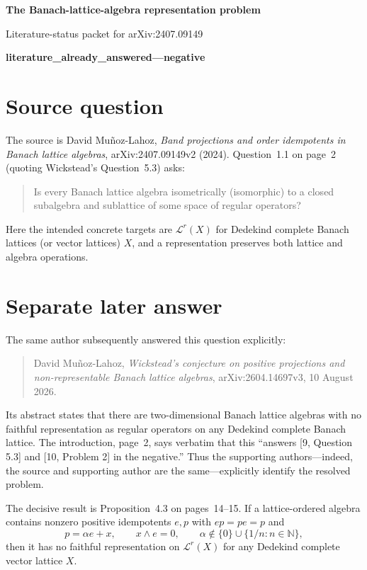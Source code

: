 \documentclass[11pt]{article}
\newcommand{\status}{\textcolor{blue!60!black}{\textbf{literature\_already\_answered---negative}}}
\begin{document}
\begin{center}
{\Large\bfseries The Banach-lattice-algebra representation problem}\par
\vspace{0.3em}
{\large Literature-status packet for arXiv:2407.09149}\par
\vspace{0.4em}
\status
\end{center}

\section*{Source question}

The source is David Mu\~noz-Lahoz, \emph{Band projections and order
idempotents in Banach lattice algebras}, arXiv:2407.09149v2 (2024).
Question~1.1 on page~2 (quoting Wickstead's Question~5.3) asks:
\begin{quote}
Is every Banach lattice algebra isometrically (isomorphic) to a closed
subalgebra and sublattice of some space of regular operators?
\end{quote}
Here the intended concrete targets are $\mathcal L^r(X)$ for Dedekind
complete Banach lattices (or vector lattices) $X$, and a representation
preserves both lattice and algebra operations.

\section*{Separate later answer}

The same author subsequently answered this question explicitly:

\begin{quote}
David Mu\~noz-Lahoz, \emph{Wickstead's conjecture on positive projections
and non-representable Banach lattice algebras}, arXiv:2604.14697v3,
10 August 2026.
\end{quote}

Its abstract states that there are two-dimensional Banach lattice algebras
with no faithful representation as regular operators on any Dedekind complete
Banach lattice.  The introduction, page~2, says verbatim that this ``answers
[9, Question 5.3] and [10, Problem 2] in the negative.''  Thus the supporting
authors---indeed, the source and supporting author are the same---explicitly
identify the resolved problem.

The decisive result is Proposition~4.3 on pages~14--15.  If a
lattice-ordered algebra contains nonzero positive idempotents $e,p$ with
$ep=pe=p$ and
\[
 p=\alpha e+x,\qquad x\wedge e=0,
 \qquad
 \alpha\notin\{0\}\cup\{1/n:n\in\mathbb N\},
\]
then it has no faithful representation on $\mathcal L^r(X)$ for any Dedekind
complete vector lattice $X$.
\end{document}
